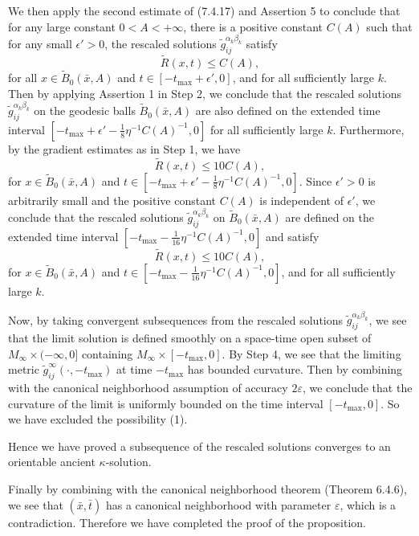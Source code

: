 We then apply the second estimate of (7.4.17) and Assertion 5 to
conclude that for any large constant $0<A<+\infty$, there is a
positive constant $C(A)$ such that for any small $\epsilon'>0$,
the rescaled solutions $\widetilde{g}^{\alpha_k\beta_k}_{ij}$
satisfy \begin{equation}
\widetilde{R}(x,t)\leq C(A), %
\end{equation} for all $x \in \widetilde{B}_{0}(\bar{x},A)$ and $t\in
[-t_{\max} + \epsilon',0]$, and for all sufficiently large $k$.
Then by applying Assertion 1 in Step 2, we conclude that the
rescaled solutions $\widetilde{g}^{\alpha_k\beta_k}_{ij}$ on the
geodesic balls $\widetilde{B}_{0}(\bar{x},A)$ are also defined on
the extended time interval $ [-t_{\max} +
\epsilon'-\frac{1}{8}\eta^{-1}C(A)^{-1},0]$ for all sufficiently
large $k$. Furthermore, by the gradient estimates as in Step 1, we
have
$$
\widetilde{R}(x,t)\leq 10C(A),
$$
for $x \in \widetilde{B}_{0}(\bar{x},A)$ and $t\in [-t_{\max} +
\epsilon'-\frac{1}{8}\eta^{-1}C(A)^{-1},0]$. Since $\epsilon'>0$
is arbitrarily small and the positive constant $C(A)$ is
independent of $\epsilon'$, we conclude that the rescaled
solutions $\widetilde{g}^{\alpha_k\beta_k}_{ij}$ on
$\widetilde{B}_{0}(\bar{x},A)$ are defined on the extended time
interval $ [-t_{\max} -\frac{1}{16}\eta^{-1}C(A)^{-1},0]$ and
satisfy \begin{equation}
\widetilde{R}(x,t)\leq 10C(A), %
\end{equation} for $x \in \widetilde{B}_{0}(\bar{x},A)$ and $t\in [-t_{\max}
-\frac{1}{16}\eta^{-1}C(A)^{-1},0]$, and for all sufficiently
large $k$.

Now, by taking convergent subsequences from the rescaled solutions
$\widetilde{g}^{\alpha_k\beta_k}_{ij}$, we see that the limit
solution is defined smoothly on a space-time open subset of
$M_{\infty}\times (-\infty,0]$ containing $M_{\infty}\times
[-t_{\max},0]$. By Step 4, we see that the limiting metric
$\widetilde{g}^{\infty}_{ij}(\cdot,-t_{\max})$ at time $-t_{\max}$
has bounded curvature. Then by combining with the canonical
neighborhood assumption of accuracy $2\varepsilon$, we conclude
that the curvature of the limit is uniformly bounded on the time
interval $[-t_{\max},0]$. So we have excluded the possibility (1).

Hence we have proved a subsequence of the rescaled solutions
converges to an orientable ancient $\kappa$-solution.

Finally by combining with the canonical neighborhood theorem
(Theorem 6.4.6), we see that $(\bar{x},\bar{t})$ has a canonical
neighborhood with parameter $\varepsilon$, which is a
contradiction. Therefore we have completed the proof of the
proposition.
\endproof

